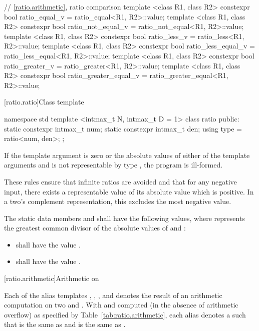 \begin{codeblockdigitsep}
{  // \ref{ratio.arithmetic}, ratio comparison
  template <class R1, class R2> constexpr bool ratio_equal_v
    = ratio_equal<R1, R2>::value;
  template <class R1, class R2> constexpr bool ratio_not_equal_v
    = ratio_not_equal<R1, R2>::value;
  template <class R1, class R2> constexpr bool ratio_less_v
    = ratio_less<R1, R2>::value;
  template <class R1, class R2> constexpr bool ratio_less_equal_v
    = ratio_less_equal<R1, R2>::value;
  template <class R1, class R2> constexpr bool ratio_greater_v
    = ratio_greater<R1, R2>::value;
  template <class R1, class R2> constexpr bool ratio_greater_equal_v
    = ratio_greater_equal<R1, R2>::value;
}
\end{codeblockdigitsep}

[ratio.ratio]{Class template }

%
\begin{codeblock}
namespace std {
  template <intmax_t N, intmax_t D = 1>
  class ratio {
  public:
    static constexpr intmax_t num;
    static constexpr intmax_t den;
    using type = ratio<num, den>;
  };
}
\end{codeblock}

\pnum
If the template argument  is zero or the absolute values of either of the
template arguments  and  is not representable by type
, the program is ill-formed. \begin{note} These rules ensure that infinite
ratios are avoided and that for any negative input, there exists a representable value
of its absolute value which is positive. In a two's complement representation, this
excludes the most negative value. \end{note}

\pnum
The static data members  and  shall have the following values,
where  represents the greatest common divisor of the absolute values of
 and :

\begin{itemize}
\item {} shall have the value .
\item {} shall have the value .
\end{itemize}

[ratio.arithmetic]{Arithmetic on }

\pnum
Each of the alias templates , , ,
and  denotes the result of an arithmetic computation on two
  and . With  and  computed (in the
absence of arithmetic overflow) as specified by Table~\ref{tab:ratio.arithmetic}, each alias
denotes a  such that  is the same as  and
 is the same as .

